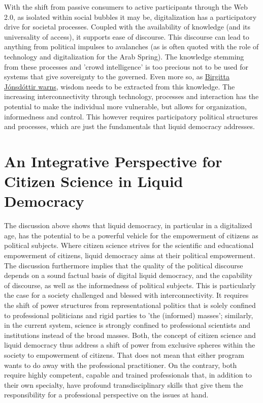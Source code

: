 With the shift from passive consumers to active participants through the Web 2.0, as isolated within social bubbles it may be, digitalization has a participatory drive for societal processes. Coupled with the availability of knowledge (and its universality of access), it supports ease of discourse. This discourse can lead to anything from political impulses to avalanches (as is often quoted with the role of technology and digitalization for the Arab Spring). The knowledge stemming from these processes and 'crowd intelligence' is too precious not to be used for systems that give sovereignty to the governed. Even more so, as \href{https://newint.org/features/2015/01/01/democracy-digital-era-keynote}{Birgitta Jónsdóttir warns},  wisdom needs to be extracted from this knowledge.
The increasing interconnectivity through technology, processes and interaction has the potential to make the individual more vulnerable, but allows for organization, informedness and control. This however requires participatory political structures and processes, which are just the fundamentals that liquid democracy addresses.


\section[An Integrative Perspective for CS in LD]{An Integrative Perspective for Citizen Science in Liquid Democracy}
\label{sec:Integration_CSLD}
The discussion above shows that liquid democracy, in particular in a digitalized age, has the potential to be a powerful vehicle for the empowerment of citizens as political subjects. Where citizen science strives for the scientific and educational empowerment of citizens, liquid democracy aims at their political empowerment. The discussion furthermore implies that the quality of the political discourse depends on a sound factual basis of digital liquid democracy, and the capability of discourse, as well as the informedness of political subjects. This is particularly the case for a society challenged and blessed with interconnectivity. It requires the shift of power structures from representational politics that is solely confined to professional politicians and rigid parties to 'the (informed) masses'; similarly, in the current system, science is strongly confined to professional scientists and institutions instead of the broad masses. Both, the concept of citizen science and liquid democracy thus address a shift of power from exclusive spheres within the society to empowerment of citizens. That does not mean that either program wants to do away with the professional practitioner. On the contrary, both require highly competent, capable and trained professionals that, in addition to their own specialty, have profound transdisciplinary skills that give them the responsibility for a professional perspective on the issues at hand.

